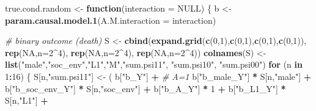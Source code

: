 \documentclass[
]{book}
\newenvironment{Shaded}{\begin{snugshade}}{\end{snugshade}}
\newcommand{\AttributeTok}[1]{\textcolor[rgb]{0.13,0.29,0.53}{#1}}
\newcommand{\CommentTok}[1]{\textcolor[rgb]{0.56,0.35,0.01}{\textit{#1}}}
\newcommand{\ConstantTok}[1]{\textcolor[rgb]{0.56,0.35,0.01}{#1}}
\newcommand{\ControlFlowTok}[1]{\textcolor[rgb]{0.13,0.29,0.53}{\textbf{#1}}}
\newcommand{\DecValTok}[1]{\textcolor[rgb]{0.00,0.00,0.81}{#1}}
\newcommand{\FunctionTok}[1]{\textcolor[rgb]{0.13,0.29,0.53}{\textbf{#1}}}
\newcommand{\NormalTok}[1]{#1}
\newcommand{\OtherTok}[1]{\textcolor[rgb]{0.56,0.35,0.01}{#1}}
\newcommand{\SpecialCharTok}[1]{\textcolor[rgb]{0.81,0.36,0.00}{\textbf{#1}}}
\newcommand{\StringTok}[1]{\textcolor[rgb]{0.31,0.60,0.02}{#1}}
\begin{document}
\begin{Shaded}
\begin{Highlighting}[]
\NormalTok{true.cond.random }\OtherTok{\textless{}{-}} \ControlFlowTok{function}\NormalTok{(}\AttributeTok{interaction =} \ConstantTok{NULL}\NormalTok{) \{}
\NormalTok{  b }\OtherTok{\textless{}{-}} \FunctionTok{param.causal.model.1}\NormalTok{(}\AttributeTok{A.M.interaction =}\NormalTok{ interaction)}
  
  \CommentTok{\# binary outcome (death)}
\NormalTok{  S }\OtherTok{\textless{}{-}} \FunctionTok{cbind}\NormalTok{(}\FunctionTok{expand.grid}\NormalTok{(}\FunctionTok{c}\NormalTok{(}\DecValTok{0}\NormalTok{,}\DecValTok{1}\NormalTok{),}\FunctionTok{c}\NormalTok{(}\DecValTok{0}\NormalTok{,}\DecValTok{1}\NormalTok{),}\FunctionTok{c}\NormalTok{(}\DecValTok{0}\NormalTok{,}\DecValTok{1}\NormalTok{),}\FunctionTok{c}\NormalTok{(}\DecValTok{0}\NormalTok{,}\DecValTok{1}\NormalTok{)), }\FunctionTok{rep}\NormalTok{(}\ConstantTok{NA}\NormalTok{,}\AttributeTok{n=}\DecValTok{2}\SpecialCharTok{\^{}}\DecValTok{4}\NormalTok{), }
             \FunctionTok{rep}\NormalTok{(}\ConstantTok{NA}\NormalTok{,}\AttributeTok{n=}\DecValTok{2}\SpecialCharTok{\^{}}\DecValTok{4}\NormalTok{), }\FunctionTok{rep}\NormalTok{(}\ConstantTok{NA}\NormalTok{,}\AttributeTok{n=}\DecValTok{2}\SpecialCharTok{\^{}}\DecValTok{4}\NormalTok{))}
  \FunctionTok{colnames}\NormalTok{(S) }\OtherTok{\textless{}{-}} \FunctionTok{list}\NormalTok{(}\StringTok{"male"}\NormalTok{,}\StringTok{"soc\_env"}\NormalTok{,}\StringTok{"L1"}\NormalTok{,}\StringTok{"M"}\NormalTok{,}\StringTok{"sum.psi11"}\NormalTok{, }\StringTok{"sum.psi10"}\NormalTok{, }
                      \StringTok{"sum.psi00"}\NormalTok{)}
  \ControlFlowTok{for}\NormalTok{ (n }\ControlFlowTok{in} \DecValTok{1}\SpecialCharTok{:}\DecValTok{16}\NormalTok{) \{}
\NormalTok{    S[n,}\StringTok{"sum.psi11"}\NormalTok{] }\OtherTok{\textless{}{-}}\NormalTok{  ( b[}\StringTok{"b\_Y"}\NormalTok{] }\SpecialCharTok{+}                                           \CommentTok{\# A=1}
\NormalTok{                             b[}\StringTok{"b\_male\_Y"}\NormalTok{] }\SpecialCharTok{*}\NormalTok{ S[n,}\StringTok{"male"}\NormalTok{] }\SpecialCharTok{+} 
\NormalTok{                             b[}\StringTok{"b\_soc\_env\_Y"}\NormalTok{] }\SpecialCharTok{*}\NormalTok{ S[n,}\StringTok{"soc\_env"}\NormalTok{] }\SpecialCharTok{+} 
\NormalTok{                             b[}\StringTok{"b\_A\_Y"}\NormalTok{] }\SpecialCharTok{*} \DecValTok{1} \SpecialCharTok{+} 
\NormalTok{                             b[}\StringTok{"b\_L1\_Y"}\NormalTok{] }\SpecialCharTok{*}\NormalTok{ S[n,}\StringTok{"L1"}\NormalTok{] }\SpecialCharTok{+}

\end{Highlighting}
\end{Shaded}
\end{document}
